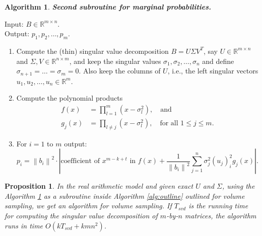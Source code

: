 \documentclass[11pt]{article}
\newtheorem{prop}[theorem]{Proposition}
\newtheorem{alg}{Algorithm}
\def\reals{\mathbb{R}}
\newcommand{\norm}[1]{\left\|#1\right\|}
\newcommand{\abs}[1]{\left|#1\right|}
\begin{document}
\begin{framed}
\begin{alg}\label{alg:svdSub}
{\bf Second subroutine for marginal probabilities.}
\end{alg}
\noindent Input: $B \in \reals^{m \times n}$. \\
\noindent Output: $p_{1}, p_{2}, \dotsc, p_{m}$.

\begin{enumerate}
\item Compute the (thin) singular value decomposition $B=U \Sigma V^{T}$, say $U \in \reals^{m \times n}$ and $\Sigma, V \in \reals^{n \times m}$, and keep the singular values $\sigma_{1}, \sigma_{2}, \dotsc, \sigma_{n}$ and define $\sigma_{n+1} = \dotsc = \sigma_{m} = 0$. Also keep the columns of $U$, i.e., the left singular vectors $u_{1}, u_{2}, \dotsc, u_{n} \in \reals^{m}$.
\item Compute the polynomial products
\begin{align*}
f(x) & = \prod_{l=1}^{m} (x - \sigma_{l}^{2}), \quad \text{and} \\
g_{j}(x) & = \prod_{l \neq j} (x - \sigma_{l}^{2}), \quad \text{for all $1 \leq j \leq m$.}
\end{align*}
\item For $i=1$ to $m$ output:
\[
p_{i} = \norm{b_{i}}^{2} \cdot \abs{\text{coefficient of $x^{m-k+t}$ in $f(x) + \dfrac{1}{\norm{b_{i}}^{2}} \sum_{j=1}^{n} \sigma_{j}^{2} (u_{j})_{i}^{2} g_{j}(x)$}}.
\]
\end{enumerate}
\end{framed}
\begin{prop} \label{prop:svdVS}
In the real arithmetic model and given exact $U$ and $\Sigma$, using the Algorithm \ref{alg:svdSub} as a subroutine inside Algorithm \ref{alg:outline} outlined for volume sampling, we get an algorithm for volume sampling. If $T_{svd}$ is the running time for computing the singular value decomposition of $m$-by-$n$ matrices, the algorithm runs in time $O(k T_{svd} + kmn^2)$.
\end{prop}
\end{document}
